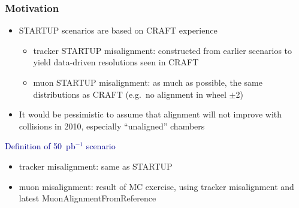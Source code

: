 \documentclass[compress]{beamer}
\begin{document}
\begin{frame}
\frametitle{Motivation}
\begin{itemize}
\item STARTUP scenarios are based on CRAFT experience

\vspace{0.1 cm}
\begin{itemize}\setlength{\itemsep}{0.25 cm}
\item tracker STARTUP misalignment: constructed from earlier scenarios to yield data-driven resolutions seen in CRAFT
\item muon STARTUP misalignment: as much as possible, the same distributions as CRAFT (e.g.~no alignment in wheel $\pm$2)
\end{itemize}

\item It would be pessimistic to assume that alignment will not improve with collisions in 2010, especially ``unaligned'' chambers
\end{itemize}

\vfill
\hspace{-0.83 cm} \textcolor{darkblue}{\Large Definition of 50~pb$^{-1}$ scenario}

\vspace{0.2 cm}
\begin{itemize}
\item tracker misalignment: same as STARTUP
\item muon misalignment: result of MC exercise, using tracker misalignment and latest MuonAlignmentFromReference
\end{itemize}
\end{frame}
\end{document}
